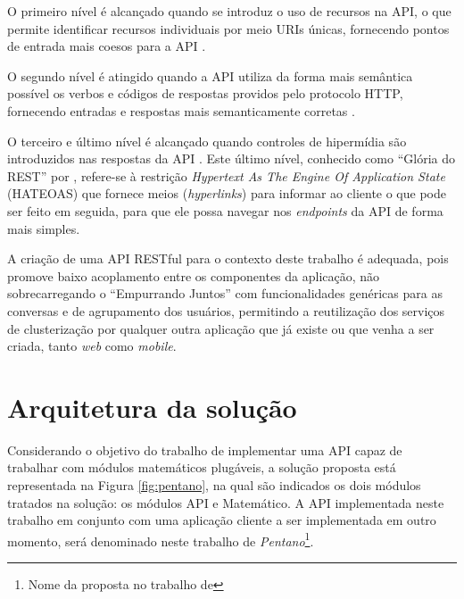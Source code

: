      O primeiro nível é alcançado quando se introduz o uso de recursos na API,
      o que permite identificar recursos individuais por meio URIs únicas,
      fornecendo pontos de entrada mais coesos para a API \cite{fowler10} \cite{richardson09}.
      
      O segundo nível é atingido quando a API utiliza da forma mais semântica possível
      os verbos e códigos de respostas providos pelo protocolo HTTP,
      fornecendo entradas e respostas mais semanticamente corretas \cite{fowler10} \cite{richardson09}.
      
      O terceiro e último nível é alcançado quando controles de hipermídia
      são introduzidos nas respostas da API \cite{fowler10} \cite{richardson09}.
      Este último nível, conhecido como ``Glória do REST'' por ,
      refere-se à restrição \textit{Hypertext As The Engine Of Application State} (HATEOAS) 
      que fornece meios (\textit{hyperlinks}) para informar ao cliente o que pode ser feito em seguida,
      para que ele possa navegar nos \textit{endpoints} da API de forma mais simples.
      
  A criação de uma API RESTful para o contexto deste trabalho é adequada, pois promove baixo acoplamento
  entre os componentes da aplicação, não sobrecarregando o ``Empurrando Juntos'' com funcionalidades genéricas
  para as conversas e de agrupamento dos usuários,
  permitindo a reutilização dos serviços de clusterização por qualquer
  outra aplicação que já existe ou que venha a ser criada, tanto \textit{web} como \textit{mobile}.
  
\section{Arquitetura da solução} \label{architecture}
    
    Considerando o objetivo do trabalho de implementar uma API capaz de trabalhar com 
    módulos matemáticos plugáveis, a solução proposta está representada na Figura \ref{fig:pentano}, 
    na qual são indicados os dois módulos tratados na solução: os módulos API e Matemático. 
    A API implementada neste trabalho em conjunto com uma aplicação cliente a ser implementada em outro momento,
    será denominado neste trabalho de \textit{Pentano}\footnote{Nome da proposta no trabalho de }.
    
